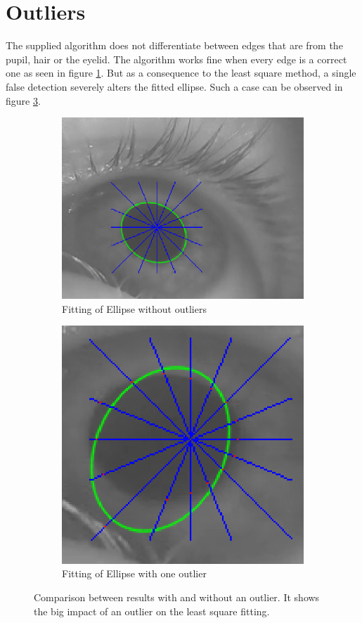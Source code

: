 \section{Outliers}
The supplied algorithm does not differentiate between edges that are from the pupil, hair or the eyelid. The algorithm works fine when every edge is a correct one as seen in figure \ref{fig:oldGood}. But as a consequence to the least square method, a single false detection severely alters the fitted ellipse. Such a case can be observed in figure \ref{fig:oldOutlier}. 
\begin{figure}
	\begin{subfigure}{.5\textwidth}
		\centering
		\includegraphics[width=\linewidth]{images/good_fit_old.png}
		\caption{Fitting of Ellipse without outliers}
		\label{fig:oldGood}
	\end{subfigure}%
	\begin{subfigure}{.5\textwidth}
		\centering
		\includegraphics[width=.8\linewidth]{images/outlier_problem.png}
		\caption{Fitting of Ellipse with one outlier}
		\label{fig:oldOutlier}
	\end{subfigure}
\caption{Comparison between results with and without an outlier. It shows the big impact of an outlier on the least square fitting.}

\end{figure}

